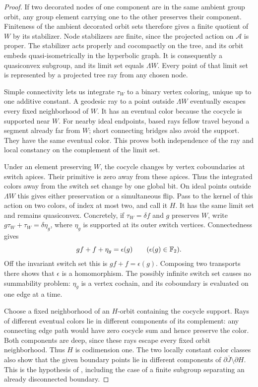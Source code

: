 \begin{proof}
If two decorated nodes of one component are in the same ambient group
orbit, any group element carrying one to the other preserves their
component. Finiteness of the ambient decorated orbit sets therefore gives
a finite quotient of $W$ by its stabilizer. Node stabilizers are finite,
since the projected action on $\mathcal A$ is proper. The stabilizer acts
properly and cocompactly on the tree, and its orbit embeds
quasi-isometrically in the hyperbolic graph. It is consequently a
quasiconvex subgroup, and its limit set equals $\Lambda W$. Every point of
that limit set is represented by a projected tree ray from any chosen
node.

Simple connectivity lets us integrate $\tau_W$ to a binary vertex coloring,
unique up to one additive constant. A geodesic ray to a point outside
$\Lambda W$ eventually escapes every fixed neighborhood of $W$. It has an
eventual color because the cocycle is supported near $W$. For nearby ideal
endpoints, based rays fellow travel beyond a segment already far from $W$;
short connecting bridges also avoid the support. They have the same
eventual color. This proves both independence of the ray and local
constancy on the complement of the limit set.

Under an element preserving $W$, the cocycle changes by vertex
coboundaries at switch apices. Their primitive is zero away from these
apices. Thus the integrated colors away from the switch set change by one
global bit. On ideal points outside $\Lambda W$ this gives either
preservation or a simultaneous flip. Pass to the kernel of this action on
two colors, of index at most two, and call it $H$. It has the same limit set
and remains quasiconvex.
Concretely, if $\tau_W=\delta f$ and $g$ preserves $W$, write
$g\tau_W+\tau_W=\delta\eta_g$, where $\eta_g$ is supported at its outer
switch vertices. Connectedness gives
\[
 gf+f+\eta_g=\epsilon(g)\qquad(\epsilon(g)\in\mathbb F_2).
\]
Off the invariant switch set this is $gf+f=\epsilon(g)$. Composing two
transports there shows that $\epsilon$ is a homomorphism. The possibly
infinite switch set causes no summability problem: $\eta_g$ is a vertex
cochain, and its coboundary is evaluated on one edge at a time.

Choose a fixed neighborhood of an $H$-orbit containing the cocycle support.
Rays of different eventual colors lie in different components of its
complement: any connecting edge path would have zero cocycle sum and hence
preserve the color. Both components are deep, since these rays escape every
fixed orbit neighborhood. Thus $H$ is codimension one. The two locally
constant color classes also show that the given boundary points lie in
different components of $\partial\bar J\setminus\partial H$. This is the
hypothesis of \cite[Theorem~1.4]{BergeronWise2012}, including the case of a
finite subgroup separating an already disconnected boundary.
\end{proof}

